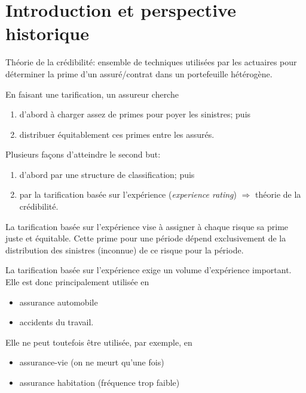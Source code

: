 
\chapter{Introduction et perspective historique}
\label{chap:introduction-historique:introduction}

Théorie de la crédibilité: ensemble de techniques utilisées par les
actuaires pour déterminer la prime d'un assuré/contrat dans un
portefeuille hétérogène.

En faisant une tarification, un assureur cherche
\begin{enumerate}
\item d'abord à charger assez de primes pour poyer les sinistres; puis
\item distribuer équitablement ces primes entre les assurés.
\end{enumerate}

Plusieurs façons d'atteindre le second but:
\begin{enumerate}
\item d'abord par une structure de classification; puis
\item par la tarification basée sur l'expérience (\emph{experience
    rating}) $\Rightarrow$ théorie de la crédibilité.
\end{enumerate}

\begin{definition}
  La tarification basée sur l'expérience vise à assigner à chaque
  risque sa prime juste et équitable. Cette prime pour une période
  dépend exclusivement de la distribution des sinistres (inconnue) de
  ce risque pour la période. \citep{Buhlmann:credibility:1969}
\end{definition}

La tarification basée sur l'expérience exige un volume d'expérience
important. Elle est donc principalement utilisée en
\begin{itemize}
\item assurance automobile
\item accidents du travail.
\end{itemize}
Elle ne peut toutefois être utilisée, par exemple, en
\begin{itemize}
\item assurance-vie (on ne meurt qu'une fois)
\item assurance habitation (fréquence trop faible)
\end{itemize}


